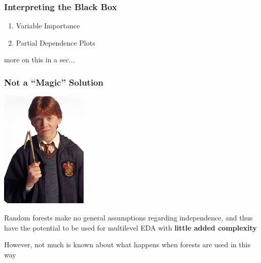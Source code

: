 \documentclass{beamer}\usepackage[]{graphicx}\usepackage[]{color}
\begin{document}
\begin{frame}
\frametitle{Interpreting the Black Box}

\begin{enumerate}
\item Variable Importance
\item Partial Dependence Plots
\end{enumerate}

\pause

\vspace{3ex}

more on this in a sec...

\end{frame}


\begin{frame}
\frametitle{Not a ``Magic'' Solution}

\begin{multicols}{2}

\begin{center}
\includegraphics[height = 2.2in]{figure/magic_wand.jpg}
\end{center}

\columnbreak

\pause

\vspace{3ex}

Random forests make no general assumptions regarding independence, and thus have the potential to be used for multilevel EDA with \textbf{little added complexity}

\pause

\vspace{3ex}

However, not much is known about what happens when forests are used in this way

\end{multicols}

\end{frame}
\end{document}
